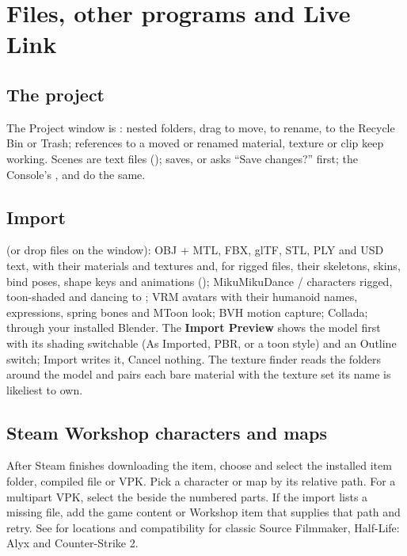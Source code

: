 \chapter{Files, other programs and Live Link}
\label{ch:files}

\section{The project}
The Project window is : nested folders, drag to move,  to rename,  to the Recycle Bin
or Trash; references to a moved or renamed material, texture or clip keep working. Scenes are text files
();  saves,  or  asks ``Save changes?'' first; the Console's ,
 and  do the same.

\section{Import}
 (or drop files on the window): OBJ + MTL, FBX, glTF, STL, PLY and USD text, with their
materials and textures and, for rigged files, their skeletons, skins, bind poses, shape keys and animations
(); MikuMikuDance  /  characters rigged, toon-shaded and
dancing to ; VRM avatars with their humanoid names, expressions, spring bones and MToon look; BVH motion
capture; Collada;  through your installed Blender. The \textbf{Import Preview} shows the model first with
its shading switchable (As Imported, PBR, or a toon style) and an Outline switch; Import writes it, Cancel nothing.
The texture finder reads the folders around the model and pairs each bare material with the texture set its name is
likeliest to own.

\section{Steam Workshop characters and maps}
After Steam finishes downloading the item, choose  and select the
installed item folder, compiled file or VPK. Pick a character or map by its relative path. For a multipart VPK,
select the  beside the numbered parts. If the import lists a missing file, add the game content
or Workshop item that supplies that path and retry. See  for locations and
compatibility for classic Source Filmmaker, Half-Life: Alyx and Counter-Strike 2.

